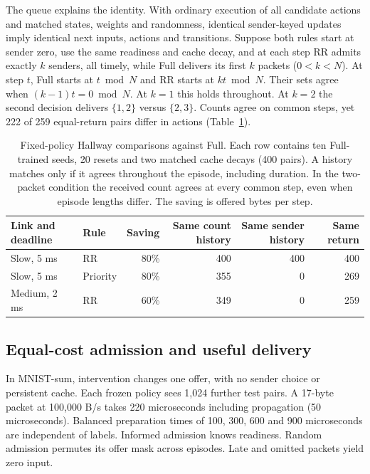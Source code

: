 \documentclass[pdflatex,sn-mathphys-num]{sn-jnl}
\begin{document}
The queue explains the identity. With ordinary execution of all candidate actions and matched states, weights and randomness, identical sender-keyed updates imply identical next inputs, actions and transitions. Suppose both rules start at sender zero, use the same readiness and cache decay, and at each step RR admits exactly $k$ senders, all timely, while Full delivers its first $k$ packets ($0<k<N$). At step $t$, Full starts at $t \bmod N$ and RR starts at $kt \bmod N$. Their sets agree when $(k-1)t=0\bmod N$. At $k=1$ this holds throughout. At $k=2$ the second decision delivers $\{1,2\}$ versus $\{2,3\}$. Counts agree on common steps, yet 222 of 259 equal-return pairs differ in actions (Table~\ref{tab:history_match}).
\begin{table}[htbp]\centering\normalsize
\caption{Fixed-policy Hallway comparisons against Full. Each row contains ten Full-trained seeds, 20 resets and two matched cache decays (400 pairs). A history matches only if it agrees throughout the episode, including duration. In the two-packet condition the received count agrees at every common step, even when episode lengths differ. The saving is offered bytes per step.}\label{tab:history_match}
{\footnotesize\setlength{\tabcolsep}{1.3pt}\begin{tabular}{llrrrr}\toprule
Link and deadline & Rule & Saving & Same count history & Same sender history & Same return\\\midrule
Slow, 5 ms & RR & 80\% & 400 & 400 & 400\\
Slow, 5 ms & Priority & 80\% & 355 & 0 & 269\\
Medium, 2 ms & RR & 60\% & 349 & 0 & 259\\
\bottomrule\end{tabular}}
\end{table}

\subsection{Equal-cost admission and useful delivery}\label{sec:eccles}
In MNIST-sum, intervention changes one offer, with no sender choice or persistent cache. Each frozen policy sees 1,024 further test pairs. A 17-byte packet at 100,000 B/s takes 220 microseconds including propagation (50 microseconds). Balanced preparation times of 100, 300, 600 and 900 microseconds are independent of labels. Informed admission knows readiness. Random admission permutes its offer mask across episodes. Late and omitted packets yield zero input.
\end{document}
